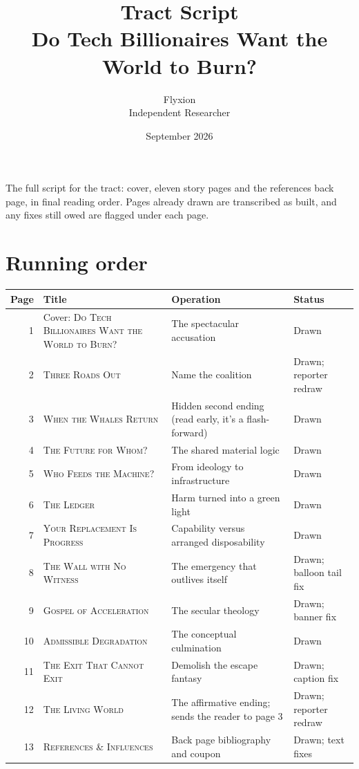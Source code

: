 \documentclass[11pt]{article}
\title{\textbf{Tract Script}\\[0.3em]\large Do Tech Billionaires Want the World to Burn?}
\author{Flyxion\\\small Independent Researcher}
\date{September 2026}
\begin{document}
\maketitle

The full script for the tract: cover, eleven story pages and the references back page, in final reading order. Pages already drawn are transcribed as built, and any fixes still owed are flagged under each page.

\section{Running order}

{\small
\begin{tabularx}{\textwidth}{@{}r>{\raggedright\arraybackslash}p{4.6cm}X>{\raggedright\arraybackslash}p{2.8cm}@{}}
\toprule
\textbf{Page} & \textbf{Title} & \textbf{Operation} & \textbf{Status}\\
\midrule
1 & Cover: \textsc{Do Tech Billionaires Want the World to Burn?} & The spectacular accusation & Drawn\\
2 & \textsc{Three Roads Out} & Name the coalition & Drawn; reporter redraw\\
3 & \textsc{When the Whales Return} & Hidden second ending (read early, it's a flash-forward) & Drawn\\
4 & \textsc{The Future for Whom?} & The shared material logic & Drawn\\
5 & \textsc{Who Feeds the Machine?} & From ideology to infrastructure & Drawn\\
6 & \textsc{The Ledger} & Harm turned into a green light & Drawn\\
7 & \textsc{Your Replacement Is Progress} & Capability versus arranged disposability & Drawn\\
8 & \textsc{The Wall with No Witness} & The emergency that outlives itself & Drawn; balloon tail fix\\
9 & \textsc{Gospel of Acceleration} & The secular theology & Drawn; banner fix\\
10 & \textsc{Admissible Degradation} & The conceptual culmination & Drawn\\
11 & \textsc{The Exit That Cannot Exit} & Demolish the escape fantasy & Drawn; caption fix\\
12 & \textsc{The Living World} & The affirmative ending; sends the reader to page 3 & Drawn; reporter redraw\\
13 & \textsc{References \& Influences} & Back page bibliography and coupon & Drawn; text fixes\\
\bottomrule
\end{tabularx}}
\end{document}
